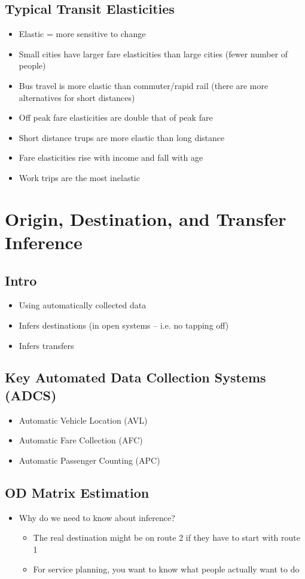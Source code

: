 \documentclass[11pt]{article}
\begin{document}
\subsection{Typical Transit Elasticities}
\label{sec:org58caaa0}
\begin{itemize}
\item Elastic = more sensitive to change
\item Small cities have larger fare elasticities than large cities (fewer number of people)
\item Bus travel is more elastic than commuter/rapid rail (there are more alternatives for short distances)
\item Off peak fare elasticities are double that of peak fare
\item Short distance trups are more elastic than long distance
\item Fare elasticities rise with income and fall with age
\item Work trips are the most inelastic
\end{itemize}
\section{Origin, Destination, and Transfer Inference}
\label{sec:org2819c93}

\subsection{Intro}
\label{sec:orgc427eeb}
\begin{itemize}
\item Using automatically collected data
\item Infers destinations (in open systems -- i.e. no tapping off)
\item Infers transfers
\end{itemize}
\subsection{Key Automated Data Collection Systems (ADCS)}
\label{sec:org92a5e15}
\begin{itemize}
\item Automatic Vehicle Location (AVL)
\item Automatic Fare Collection (AFC)
\item Automatic Passenger Counting (APC)
\end{itemize}
\subsection{OD Matrix Estimation}
\label{sec:org55ce766}
\begin{itemize}
\item Why do we need to know about inference?
\begin{itemize}
\item The real destination might be on route 2 if they have to start with route 1
\item For service planning, you want to know what people actually want to do
\end{itemize}
\end{itemize}
\end{document}
